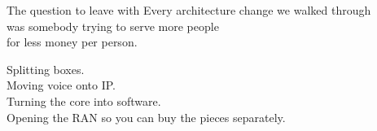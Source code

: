 \begin{frame}{The question to leave with}
  \vspace{1.0em}
  \centering
  \Large
  Every architecture change we walked through\\
  was somebody trying to serve more people\\
  for less money per person.

  \vspace{1.4em}
  \normalsize
  Splitting boxes. \\Moving voice onto IP. \\Turning the core into software.\\
  Opening the RAN so you can buy the pieces separately.

  \vspace{1.4em}
\end{frame}
